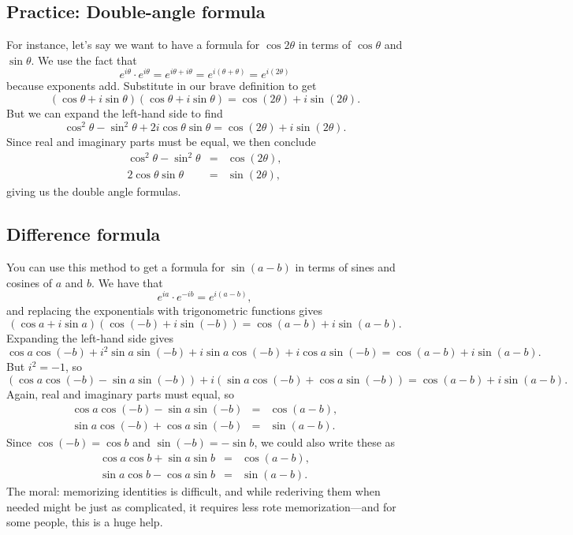 \documentclass[12pt]{handout}
\begin{document}
\subsection*{Practice: Double-angle formula}

For instance, let's say we want to have a formula for $\cos 2\theta$ in
terms of $\cos \theta$ and $\sin \theta$.  We use the fact that
$$
e^{i\theta} \cdot e^{i\theta} = e^{i\theta + i\theta} = e^{i(\theta + \theta)} = e^{i (2\theta)}
$$
because exponents add.  Substitute in our brave definition to get
$$
(\cos \theta + i \sin \theta)(\cos \theta + i \sin \theta) = \cos (2\theta) + i \sin (2\theta).
$$
But we can expand the left-hand side to find
$$
\cos^2 \theta - \sin^2 \theta + 2 i \cos \theta \sin \theta = \cos (2 \theta) + i \sin(2\theta).
$$
Since real and imaginary parts must be equal, we then conclude
\begin{eqnarray*}
  \cos^2 \theta - \sin^2 \theta &=& \cos (2 \theta), \\
 2 \cos \theta \sin \theta &=& \sin(2\theta),
\end{eqnarray*}
giving us the double angle formulas.

\subsection*{Difference formula}

You can use this method to get a formula for $\sin (a - b)$ in terms
of sines and cosines of $a$ and $b$.  We have that
$$
e^{ia} \cdot e^{-ib} = e^{i(a-b)},
$$
and replacing the exponentials with trigonometric functions gives
$$
(\cos a + i \sin a)(\cos (-b) + i \sin (-b)) = \cos(a-b) + i \sin (a-b).
$$
Expanding the left-hand side gives
$$
\cos a \cos (-b) + i^2 \sin a \sin (-b) + i \sin a \cos (-b) + i \cos a \sin (-b) = \cos (a-b) + i \sin(a-b).
$$
But $i^2 = -1$, so
$$
\left( \cos a \cos (-b) - \sin a \sin (-b) \right) + i \left( \sin a \cos (-b) + \cos a \sin (-b) \right) = \cos (a-b) + i \sin(a-b).
$$
Again, real and imaginary parts must equal, so
\begin{eqnarray*}
  \cos a \cos (-b) - \sin a \sin (-b) &=& \cos (a-b), \\
  \sin a \cos (-b) + \cos a \sin (-b) &=& \sin(a-b).
\end{eqnarray*}
Since $\cos (-b) = \cos b$ and $\sin (-b) = -\sin b$, we could also write these as
\begin{eqnarray*}
  \cos a \cos b + \sin a \sin b &=& \cos (a-b), \\
  \sin a \cos b - \cos a \sin b &=& \sin(a-b).
\end{eqnarray*}
The moral: memorizing identities is difficult, and while rederiving
them when needed might be just as complicated, it requires less rote
memorization---and for some people, this is a huge help.
\end{document}
